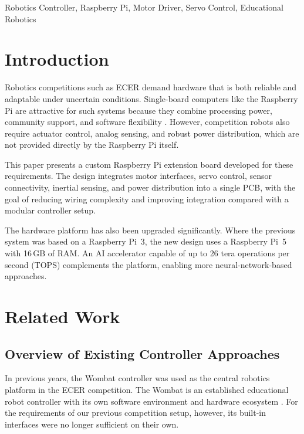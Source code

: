 \documentclass[conference]{IEEEtran}
\begin{document}
	\begin{IEEEkeywords}
		Robotics Controller, Raspberry Pi, Motor Driver, Servo Control, Educational Robotics
	\end{IEEEkeywords}
	
	\section{Introduction}
	
	Robotics competitions such as ECER demand hardware that is both reliable and adaptable under uncertain conditions. Single-board computers like the Raspberry Pi are attractive for such systems because they combine processing power, community support, and software flexibility \cite{b1}. However, competition robots also require actuator control, analog sensing, and robust power distribution, which are not provided directly by the Raspberry Pi itself.
	
	This paper presents a custom Raspberry Pi extension board developed for these requirements. The design integrates motor interfaces, servo control, sensor connectivity, inertial sensing, and power distribution into a single PCB, with the goal of reducing wiring complexity and improving integration compared with a modular controller setup.
	
	The hardware platform has also been upgraded significantly. Where the previous system was based on a Raspberry Pi~3, the new design uses a Raspberry Pi~5 with 16\,GB of RAM. An AI accelerator \cite{b3} capable of up to 26 tera operations per second (TOPS) complements the platform, enabling more neural-network-based approaches.
	
	\section{Related Work}
	
	\subsection{Overview of Existing Controller Approaches}
	
	In previous years, the Wombat controller was used as the central robotics platform in the ECER competition. The Wombat is an established educational robot controller with its own software environment and hardware ecosystem \cite{b7}. For the requirements of our previous competition setup, however, its built-in interfaces were no longer sufficient on their own.
	
\end{document}
